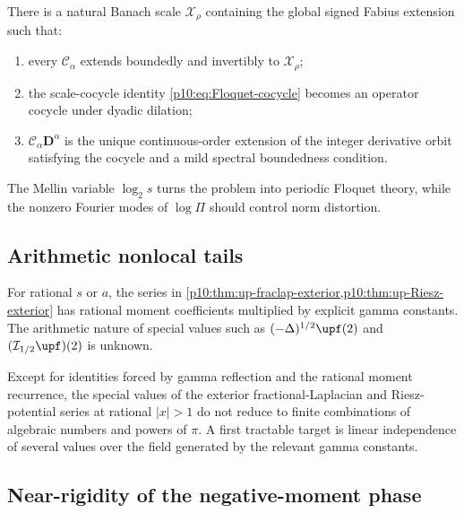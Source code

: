 \documentclass[11pt,oneside]{article}
\theoremstyle{definition}
\theoremstyle{remark}
\newcommand{\1}{\mathbf 1}
\begin{document}
\begin{conjecture}\label{p10:conj:Floquet-space}
There is a natural Banach scale \(\mathcal X_\rho\) containing the global signed Fabius
extension such that:
\begin{enumerate}
\item every \(\mathcal C_\alpha\) extends boundedly and invertibly to
\(\mathcal X_\rho\);
\item the scale-cocycle identity \eqref{p10:eq:Floquet-cocycle} becomes an operator cocycle
under dyadic dilation;
\item \(\mathcal C_\alpha\mathbf D^\alpha\) is the unique continuous-order extension of
the integer derivative orbit satisfying the cocycle and a mild spectral boundedness
condition.
\end{enumerate}
The Mellin variable \(\log_2s\) turns the problem into periodic Floquet theory, while
the nonzero Fourier modes of \(\log\Pi\) should control norm distortion.
\end{conjecture}

\subsection{Arithmetic nonlocal tails}

For rational \(s\) or \(a\), the series in
\cref{p10:thm:up-fraclap-exterior,p10:thm:up-Riesz-exterior} has rational moment coefficients
multiplied by explicit gamma constants.  The arithmetic nature of special values such
as
\(
 (-\Delta)^{1/2}\upf(2)
\)
and \((\mathcal I_{1/2}\upf)(2)\) is unknown.

\begin{conjecture}
\label{p10:conj:nonlocal-arithmetic}
Except for identities forced by gamma reflection and the rational moment recurrence,
the special values of the exterior fractional-Laplacian and Riesz-potential series at
rational \(|x|>1\) do not reduce to finite combinations of algebraic numbers and powers
of \(\pi\).  A first tractable target is linear independence of several values over the
field generated by the relevant gamma constants.
\end{conjecture}



\subsection{Near-rigidity of the negative-moment phase}
\end{document}
